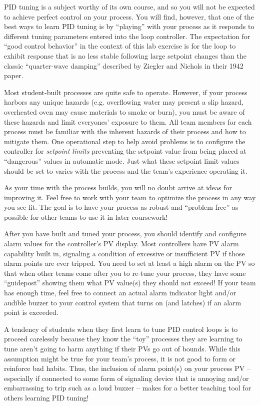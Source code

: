 PID tuning is a subject worthy of its own course, and so you will not be expected to achieve perfect control on your process.  You will find, however, that one of the best ways to learn PID tuning is by ``playing'' with your process as it responds to different tuning parameters entered into the loop controller.  The expectation for ``good control behavior'' in the context of this lab exercise is for the loop to exhibit response that is no less stable following large setpoint changes than the classic ``quarter-wave damping'' described by Ziegler and Nichols in their 1942 paper.

\vskip 10pt

Most student-built processes are quite safe to operate.  However, if your process harbors any unique hazards (e.g. overflowing water may present a slip hazard, overheated oven may cause materials to smoke or burn), you must be aware of these hazards and limit everyones' exposure to them.  All team members for each process must be familiar with the inherent hazards of their process and how to mitigate them.  One operational step to help avoid problems is to configure the controller for {\it setpoint limits} preventing the setpoint value from being placed at ``dangerous'' values in automatic mode.  Just what these setpoint limit values should be set to varies with the process and the team's experience operating it.

As your time with the process builds, you will no doubt arrive at ideas for improving it.  Feel free to work with your team to optimize the process in any way you see fit.  The goal is to have your process as robust and ``problem-free'' as possible for other teams to use it in later coursework!

\vskip 10pt

After you have built and tuned your process, you should identify and configure alarm values for the controller's PV display.  Most controllers have PV alarm capability built in, signaling a condition of excessive or insufficient PV if those alarm points are ever tripped.  You need to set at least a high alarm on the PV so that when other teams come after you to re-tune your process, they have some ``guidepost'' showing them what PV value(s) they should not exceed!  If your team has enough time, feel free to connect an actual alarm indicator light and/or audible buzzer to your control system that turns on (and latches) if an alarm point is exceeded.

A tendency of students when they first learn to tune PID control loops is to proceed carelessly because they know the ``toy'' processes they are learning to tune aren't going to harm anything if their PVs go out of bounds.  While this assumption might be true for your team's process, it is not good to form or reinforce bad habits.  Thus, the inclusion of alarm point(s) on your process PV -- especially if connected to some form of signaling device that is annoying and/or embarrassing to trip such as a loud buzzer -- makes for a better teaching tool for others learning PID tuning!



